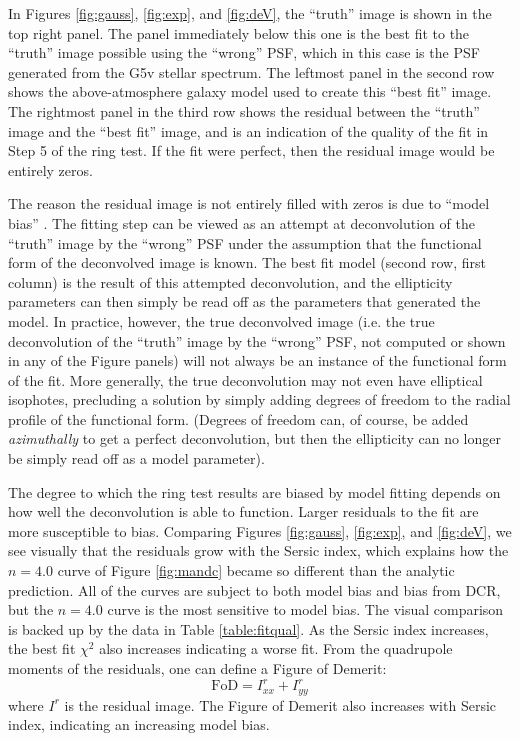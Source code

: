 \documentclass[apj]{emulateapj}
\begin{document}
In Figures \ref{fig:gauss}, \ref{fig:exp}, and \ref{fig:deV}, the
``truth'' image is shown in the top right panel.  The panel
immediately below this one is the best fit to the ``truth'' image
possible using the ``wrong'' PSF, which in this case is the PSF
generated from the G5v stellar spectrum.  The leftmost panel in the
second row shows the above-atmosphere galaxy model used to create this
``best fit'' image.  The rightmost panel in the third row shows the
residual between the ``truth'' image and the ``best fit'' image, and
is an indication of the quality of the fit in Step 5 of the ring test.
If the fit were perfect, then the residual image would be entirely
zeros.

The reason the residual image is not entirely filled with zeros is due
to ``model bias'' \citep{Melchior2009, Voigt2010, Bernstein2010}.  The
fitting step can be viewed as an attempt at deconvolution of the
``truth'' image by the ``wrong'' PSF under the assumption that the
functional form of the deconvolved image is known.  The best fit model
(second row, first column) is the result of this attempted
deconvolution, and the ellipticity parameters can then simply be read
off as the parameters that generated the model.  In practice, however,
the true deconvolved image (i.e. the true deconvolution of the
``truth'' image by the ``wrong'' PSF, not computed or shown in any of
the Figure panels) will not always be an instance of the functional
form of the fit.  More generally, the true deconvolution may not even
have elliptical isophotes, precluding a solution by simply adding
degrees of freedom to the radial profile of the functional form.
(Degrees of freedom can, of course, be added {\it azimuthally} to get
a perfect deconvolution, but then the ellipticity can no longer be
simply read off as a model parameter).

The degree to which the ring test results are biased by model fitting
depends on how well the deconvolution is able to function.  Larger
residuals to the fit are more susceptible to bias.  Comparing Figures
\ref{fig:gauss}, \ref{fig:exp}, and \ref{fig:deV}, we see visually
that the residuals grow with the Sersic index, which explains how the
$n=4.0$ curve of Figure \ref{fig:mandc} became so different than the
analytic prediction.  All of the curves are subject to both model bias
and bias from DCR, but the $n=4.0$ curve is the most sensitive to
model bias.  The visual comparison is backed up by the data in Table
\ref{table:fitqual}.  As the Sersic index increases, the best fit
$\chi^2$ also increases indicating a worse fit.  From the quadrupole
moments of the residuals, one can define a Figure of Demerit:
\begin{equation}
  \mathrm{FoD} = I^r_{xx} + I^r_{yy}
\end{equation}
where $I^r$ is the residual image.  The Figure of Demerit also
increases with Sersic index, indicating an increasing model bias.
\end{document}
